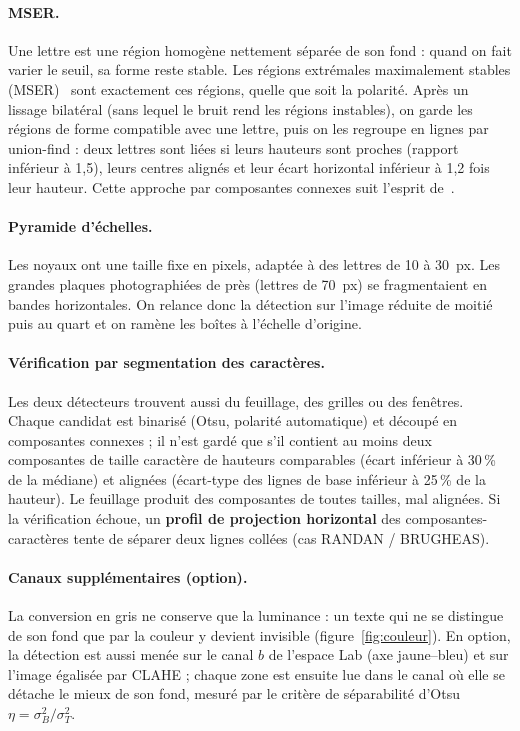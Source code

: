 \documentclass[11pt,a4paper]{article}
\begin{document}
\paragraph{MSER.} Une lettre est une région homogène nettement séparée de son fond : quand on fait varier le seuil, sa forme reste stable. Les régions extrémales maximalement stables (MSER)~\cite{mser} sont exactement ces régions, quelle que soit la polarité. Après un lissage bilatéral (sans lequel le bruit rend les régions instables), on garde les régions de forme compatible avec une lettre, puis on les regroupe en lignes par union-find : deux lettres sont liées si leurs hauteurs sont proches (rapport inférieur à 1,5), leurs centres alignés et leur écart horizontal inférieur à 1,2 fois leur hauteur. Cette approche par composantes connexes suit l'esprit de~\cite{neumann}.

\paragraph{Pyramide d'échelles.} Les noyaux ont une taille fixe en pixels, adaptée à des lettres de 10 à 30~px. Les grandes plaques photographiées de près (lettres de 70~px) se fragmentaient en bandes horizontales. On relance donc la détection sur l'image réduite de moitié puis au quart et on ramène les boîtes à l'échelle d'origine.

\paragraph{Vérification par segmentation des caractères.} Les deux détecteurs trouvent aussi du feuillage, des grilles ou des fenêtres. Chaque candidat est binarisé (Otsu, polarité automatique) et découpé en composantes connexes ; il n'est gardé que s'il contient au moins deux composantes de taille \og caractère\fg{} de hauteurs comparables (écart inférieur à 30\,\% de la médiane) et alignées (écart-type des lignes de base inférieur à 25\,\% de la hauteur). Le feuillage produit des composantes de toutes tailles, mal alignées. Si la vérification échoue, un \textbf{profil de projection horizontal} des composantes-caractères tente de séparer deux lignes collées (cas \og RANDAN / BRUGHEAS\fg).

\paragraph{Canaux supplémentaires (option).} La conversion en gris ne conserve que la luminance : un texte qui ne se distingue de son fond que par la couleur y devient invisible (figure~\ref{fig:couleur}). En option, la détection est aussi menée sur le canal $b$ de l'espace Lab (axe jaune--bleu) et sur l'image égalisée par CLAHE ; chaque zone est ensuite lue dans le canal où elle se détache le mieux de son fond, mesuré par le critère de séparabilité d'Otsu $\eta = \sigma_B^2/\sigma_T^2$.
\end{document}
